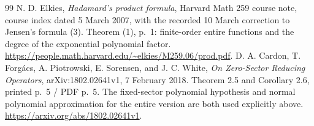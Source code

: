 \documentclass[11pt]{article}
\theoremstyle{remark}\newtheorem{remark}[theorem]{Remark}
\begin{document}
\begin{thebibliography}{99}
 N. D. Elkies, \emph{Hadamard's product formula},
Harvard Math 259 course note, course index dated 5 March 2007,
with the recorded 10 March correction to Jensen's formula (3).
Theorem (1), p.~1: finite-order entire functions and the degree
of the exponential polynomial factor.
\url{https://people.math.harvard.edu/~elkies/M259.06/prod.pdf}.
 D. A. Cardon, T. Forg\'acs, A. Piotrowski,
E. Sorensen, and J. C. White, \emph{On Zero-Sector Reducing Operators},
arXiv:1802.02641v1, 7 February 2018.
Theorem 2.5 and Corollary 2.6, printed p.~5 / PDF p.~5.
The fixed-sector polynomial hypothesis and normal polynomial
approximation for the entire version are both used explicitly above.
\url{https://arxiv.org/abs/1802.02641v1}.


\end{thebibliography}
\end{document}
